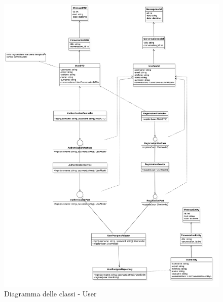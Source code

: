     \begin{figure}[H]
        \centering
        \includegraphics[width=\linewidth, height=0.8\textheight, keepaspectratio]{./img/User.png}
        \caption{Diagramma delle classi - User}
        \label{fig:user}
    \end{figure}

